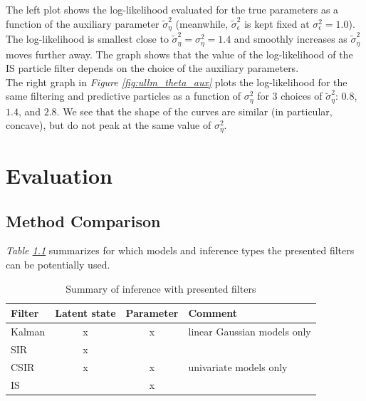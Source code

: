 \documentclass[11pt, oneside]{scrreprt}   	%
\begin{document}
The left plot shows the log-likelihood evaluated for the true parameters as a function of the auxiliary parameter $\tilde{\sigma}_{\eta}^2$ (meanwhile, $\tilde{\sigma}_{\epsilon}^2$ is kept fixed at $\sigma_{\epsilon}^2=1.0$). The log-likelihood is smallest close to $\tilde{\sigma}_{\eta}^2=\sigma_{\eta}^2=1.4$ and smoothly increases as $\tilde{\sigma}_{\eta}^2$ moves further away. The graph shows that the value of the log-likelihood of the IS particle filter depends on the choice of the auxiliary parameters.\\

The right graph in \textit{Figure \ref{fig:ullm_theta_aux}} plots the log-likelihood for the same filtering and predictive particles as a function of $\sigma_{\eta}^2$ for 3 choices of $\tilde{\sigma}_{\eta}^2$: $0.8$, $1.4$, and $2.8$. We see that the shape of the curves are similar (in particular, concave), but do not peak at the same value of $\sigma_{\eta}^2$. 

\chapter{Evaluation}
\label{chp:evaluation}

\section{Method Comparison}
\textit{Table \ref{tab:filter_summary}} summarizes for which models and inference types the presented filters can be potentially used. \\

\begin{table}[h!]
\centering
\begin{tabular}{lccl}
\hline
Filter  & Latent state & Parameter & Comment\\
\hline
Kalman    & x & x & linear Gaussian models only\\
SIR      & x & &\\
CSIR      & x & x & univariate models only\\
IS      & & x & \\
\hline
\end{tabular}
\caption{Summary of inference with presented filters}
\label{tab:filter_summary}
\end{table}
\end{document}
